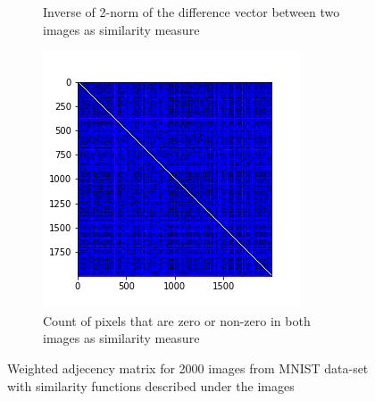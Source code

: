 \documentclass[10pt,a4paper, nocenter]{report}
\begin{document}
\begin{enumerate}
\begin{figure}[h]
\begin{center}
\begin{subfigure}[b]{0.3\textwidth}
                    \caption{Inverse of 2-norm of the difference vector between two images as similarity measure}
                    \label{fig:w_2norm}
                \end{subfigure}           
                \begin{subfigure}[b]{0.3\textwidth}
                    \centering
                    \includegraphics[width=\textwidth]{../../images/w_hamming.png}
                    \caption{Count of pixels that are zero or non-zero in both images as similarity measure}
                    \label{fig:w_hamming}
                \end{subfigure}           
            \end{center}
            \caption{Weighted adjecency matrix for 2000 images from MNIST data-set with similarity functions described under the images}
            \label{fig:mnistWImages}
        \end{figure}



\end{enumerate}
\end{document}
